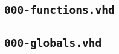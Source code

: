 %

\subsection{\texttt{000-functions.vhd}} \label{app:000-functions}


\subsection{\texttt{000-globals.vhd}} \label{app:000-globals}


